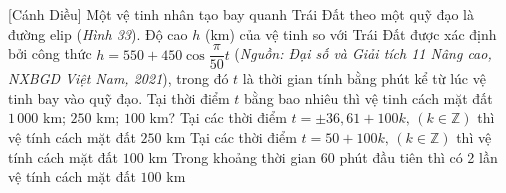 \begin{ex}%
[Cánh Diều]%
	Một vệ tinh nhân tạo bay quanh Trái Đất theo một quỹ đạo là đường elip (\textit{Hình 33}). Độ cao $h$ (km) của vệ tinh so với Trái Đất được xác định bởi công thức $h=550+450\cos \dfrac{\pi}{50}t$ (\textit{Nguồn: Đại số và Giải tích 11 Nâng cao, NXBGD Việt Nam, 2021}), trong đó $t$ là thời gian tính bằng phút kể từ lúc vệ tinh bay vào quỹ đạo. Tại thời điểm $t$ bằng bao nhiêu thì vệ tinh cách mặt đất $1\,000$ km; $250$ km; $100$ km?	
	{\True Tại các thời điểm $t=\pm36{,}61+100k,\,(k\in\mathbb{Z})$ thì vệ tính cách mặt đất $250$ km}
	{\True Tại các thời điểm $t=50+100k, \,(k\in\mathbb{Z})$ thì vệ tính cách mặt đất $100$ km}
	{Trong khoảng thời gian $60$ phút đầu tiên thì có 2 lần vệ tính cách mặt đất $100$ km}
\end{ex}

